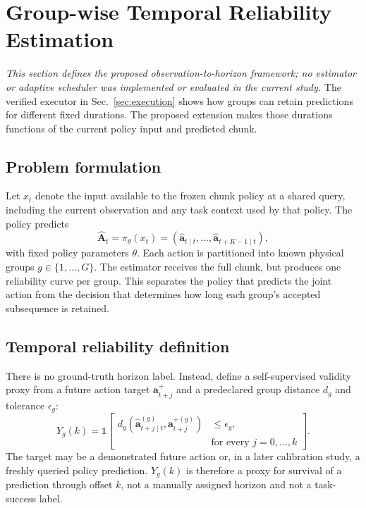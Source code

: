\section{Group-wise Temporal Reliability Estimation}
\label{sec:method}

\textit{This section defines the proposed observation-to-horizon framework; no
estimator or adaptive scheduler was implemented or evaluated in the current
study.}  The verified executor in Sec.~\ref{sec:execution} shows how groups can
retain predictions for different fixed durations.  The proposed extension makes
those durations functions of the current policy input and predicted chunk.

\subsection{Problem formulation}

Let $x_t$ denote the input available to the frozen chunk policy at a shared
query, including the current observation and any task context used by that
policy.  The policy predicts
\begin{equation}
\widehat{\mathbf A}_t=\pi_\theta(x_t)
 = (\widehat{\mathbf a}_{t\mid t},\ldots,
    \widehat{\mathbf a}_{t+K-1\mid t}),
\label{eq:method_chunk}
\end{equation}
with fixed policy parameters $\theta$.  Each action is partitioned into known
physical groups $g\in\{1,\ldots,G\}$.  The estimator receives the full chunk,
but produces one reliability curve per group.  This separates the policy that
predicts the joint action from the decision that determines how long each
group's accepted subsequence is retained.

\subsection{Temporal reliability definition}

There is no ground-truth horizon label.  Instead, define a self-supervised
validity proxy from a future action target $\mathbf a^+_{t+j}$ and a
predeclared group distance $d_g$ and tolerance $\epsilon_g$:
\begin{equation}
Y_g(k)=\mathbb{1}\!\left[
\begin{aligned}
 d_g\!\left(\widehat{\mathbf a}^{(g)}_{t+j\mid t},
              \mathbf a^{+(g)}_{t+j}\right)&\leq\epsilon_g,\\[-1mm]
 &\text{for every } j=0,\ldots,k
\end{aligned}\right].
\label{eq:validity_proxy}
\end{equation}
The target may be a demonstrated future action or, in a later calibration
study, a freshly queried policy prediction.  $Y_g(k)$ is therefore a proxy for
survival of a prediction through offset $k$, not a manually assigned horizon and
not a task-success label.

